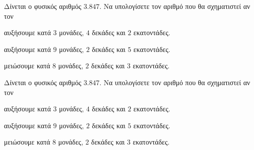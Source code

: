 Δίνεται ο φυσικός αριθμός $ 3.847 $. Να υπολογίσετε τον αριθμό που θα σχηματιστεί αν τον
\begin{rlist}
\item αυξήσουμε κατά $ 3 $ μονάδες, $ 4 $ δεκάδες και $ 2 $ εκατοντάδες.
\item αυξήσουμε κατά $ 9 $ μονάδες, $ 2 $ δεκάδες και $ 5 $ εκατοντάδες.
\item μειώσουμε κατά $ 8 $ μονάδες, $ 2 $ δεκάδες και $ 3 $ εκατοντάδες.
\end{rlist}
Δίνεται ο φυσικός αριθμός $ 3.847 $. Να υπολογίσετε τον αριθμό που θα σχηματιστεί αν τον
\begin{rlist}
\item αυξήσουμε κατά $ 3 $ μονάδες, $ 4 $ δεκάδες και $ 2 $ εκατοντάδες.
\item αυξήσουμε κατά $ 9 $ μονάδες, $ 2 $ δεκάδες και $ 5 $ εκατοντάδες.
\item μειώσουμε κατά $ 8 $ μονάδες, $ 2 $ δεκάδες και $ 3 $ εκατοντάδες.
\end{rlist}
